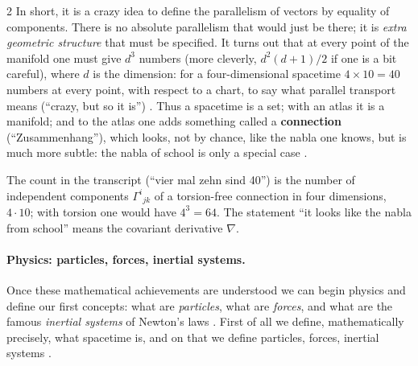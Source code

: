 \begin{paracol}{2}
In short, it is a crazy idea to define the parallelism of vectors by equality of components. There is no absolute
parallelism that would just be there; it is \emph{extra geometric structure} that must be specified. It turns out that at
every point of the manifold one must give $d^3$ numbers (more cleverly, $d^2(d+1)/2$ if one is a bit careful), where $d$
is the dimension: for a four-dimensional spacetime $4\times 10=40$ numbers at every point, with respect to a chart,
to say what parallel transport means (``crazy, but so it is'') .
Thus a spacetime is a set; with an atlas it is a manifold; and to the atlas one adds something called a
\textbf{connection} (``Zusammenhang''), which looks, not by chance, like the nabla one knows, but is much more subtle:
the nabla of school is only a special case .
\begin{coursenote}
The count in the transcript (``vier mal zehn sind 40'') is the number of independent components $\Gamma^i{}_{jk}$ of a
torsion-free connection in four dimensions, $4\cdot 10$; with torsion one would have $4^3=64$. The statement
``it looks like the nabla from school'' means the covariant derivative $\nabla$.
\end{coursenote}

\paragraph{Physics: particles, forces, inertial systems.} Once these mathematical achievements are understood we can
begin physics and define our first concepts: what are \emph{particles}, what are \emph{forces}, and what are the
famous \emph{inertial systems} of Newton's laws . First of all we define, mathematically
precisely, what spacetime is, and on that we define particles, forces, inertial systems .


\end{paracol}
